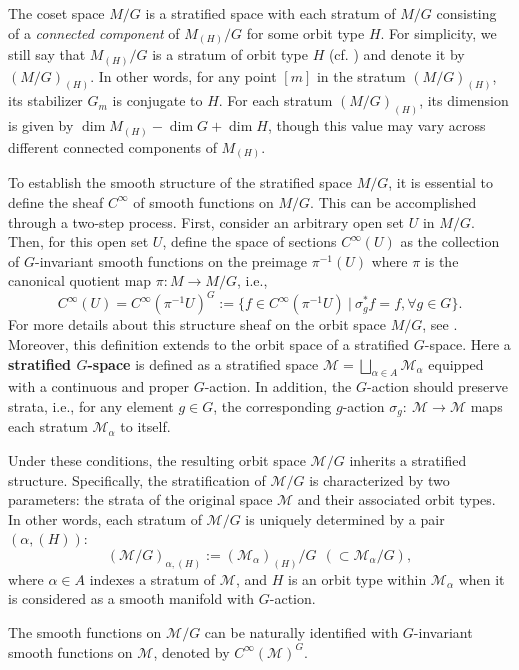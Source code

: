\documentclass[12pt]{amsart}
\theoremstyle{definition}
\numberwithin{equation}{section}
\newcommand{\CinfcalM}{C^\infty(\mathcal{M})}
\newcommand{\Cinf}{C^\infty}
\newcommand{\SET}[1]{\{#1\}}
\begin{document}
The coset space $M/G$ is a stratified space with each stratum of $M/G$ consisting of a \textit{connected component} of $M_{(H)}/G$ for some orbit type $H$. For  simplicity, we still say that  $M_{(H)}/G$ is a stratum of orbit type $H$ (cf. \cite[Remark 1.3]{SLannals}) and denote it by $(M/G)_{(H)} $. In other words, for any point $[m]$ in the stratum $(M/G)_{(H)}$, its stabilizer $G_m$ is conjugate to $H$. For each stratum $(M/G)_{(H)}$, its dimension is given by $\dim M_{(H)}-\dim G+\dim H$, though this value may vary across different connected components of $M_{(H)}$.
	
	
	To establish the smooth structure of the stratified space $M/G$, it is essential to define the sheaf $\Cinf$ of smooth functions on $M/G$. This can be accomplished through a two-step process. First, consider an arbitrary open set $U$ in $M/G$. Then, for this open set $U$, define the space of sections $\Cinf(U)$ as the collection of $G$-invariant smooth functions on the preimage $\pi^{-1}(U)$ where $\pi$ is the canonical quotient map $\pi: M \to M/G$, i.e., 	
	$$\Cinf(U)=\Cinf(\pi^{-1}U)^G:=\SET{f\in \Cinf (\pi^{-1}U)~|~ \sigma_g^* f=f,\forall g\in G}.$$
	For more details about this structure sheaf on the orbit space $M/G$, see \cite{Pflaumbook}.
	Moreover, this definition extends to the orbit space of {a stratified $G$-space}. Here    a \textbf{stratified $G$-space} is defined as a stratified space $\mathcal{M}=\bigsqcup_{\alpha\in{A}} \mathcal{M}_{\alpha}$ equipped with a continuous and proper $G$-action. In addition, the $G$-action should preserve strata, i.e.,  for any element $g\in G$, the corresponding $g$-action $\sigma_g:~\mathcal{M}\to \mathcal{M}$ maps each stratum $\mathcal{M}_{\alpha}$ to itself.
	
	Under these conditions, the resulting orbit space $\mathcal{M}/G$ inherits a stratified structure.
	 Specifically,  the stratification of $\mathcal{M}/G$ is characterized by two parameters: the strata of the original space $\mathcal{M}$ and their associated orbit types. In other words, each stratum of $\mathcal{M}/G$ is uniquely determined by a pair $(\alpha,(H))$:$$(\mathcal{M}/G)_{\alpha,(H)}:=(\mathcal{M}_{\alpha})_{(H)}/G   ~~(\subset \mathcal{M}_{\alpha}/G), $$ where $\alpha\in A$ indexes a stratum of $\mathcal{M}$, and $H$ is an orbit type within $\mathcal{M}_{\alpha}$ when it is considered as a smooth manifold with $G$-action.  
	
	The smooth functions on $\mathcal{M}/G$ can be naturally identified with $G$-invariant smooth functions on $\mathcal{M}$, denoted by $\CinfcalM^G$.
	
\end{document}
